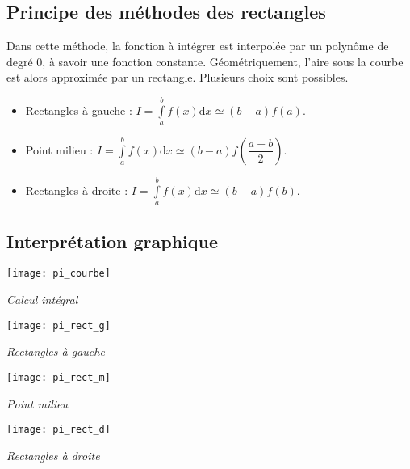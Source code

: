 \subsection{Principe des méthodes des rectangles}
\begin{defi}
Dans cette méthode, la fonction à intégrer est interpolée par un polynôme de degré 0, à savoir une fonction constante. Géométriquement, l'aire sous la courbe est alors approximée par un rectangle. Plusieurs choix sont possibles.

\begin{itemize}
\item Rectangles à gauche : $ I = \int\limits_a^{b} f(x) \mathrm{d}x \simeq \left(b-a\right) f(a). $
\item Point milieu : $ I = \int\limits_a^{b} f(x) \mathrm{d}x \simeq \left(b-a\right) f\left(\dfrac{a+b}{2}\right). $
\item Rectangles à droite :  $ I = \int\limits_a^{b} f(x) \mathrm{d}x \simeq \left(b-a\right) f(b). $
\end{itemize}

\end{defi}

\subsection{Interprétation graphique}

\begin{minipage}[c]{.24\linewidth}
\begin{center}
\texttt{[image: pi\_courbe]}

\textit{Calcul intégral}
\end{center}
\end{minipage}\hfill
\begin{minipage}[c]{.24\linewidth}
\begin{center}
\texttt{[image: pi\_rect\_g]}

\textit{Rectangles à gauche}
\end{center}
\end{minipage}\hfill
\begin{minipage}[c]{.24\linewidth}
\begin{center}
\texttt{[image: pi\_rect\_m]}

\textit{Point milieu}
\end{center}
\end{minipage}\hfill
\begin{minipage}[c]{.24\linewidth}
\begin{center}
\texttt{[image: pi\_rect\_d]}

\textit{Rectangles à droite}
\end{center}
\end{minipage}


